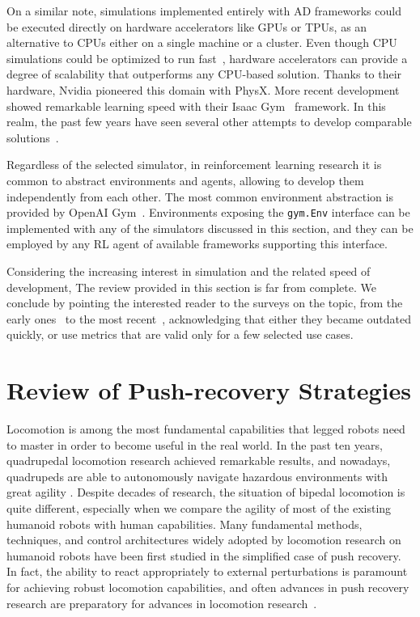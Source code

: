 On a similar note, simulations implemented entirely with \ac{AD} frameworks could be executed directly on hardware accelerators like \acp{GPU} or \acp{TPU}, as an alternative to \acp{CPU} either on a single machine or a cluster.
Even though \ac{CPU} simulations could be optimized to run fast~\parencite{hwangbo_per-contact_2018}, hardware accelerators can provide a degree of scalability that outperforms any \ac{CPU}-based solution.
Thanks to their hardware, Nvidia pioneered this domain with PhysX.
More recent development showed remarkable learning speed with their Isaac Gym~\parencite{liangGPUAcceleratedRoboticSimulation2018s, makoviychuk_isaac_2021, rudin_learning_2021} framework.
In this realm, the past few years have seen several other attempts to develop comparable solutions~\parencite{heiden_neuralsim_2021, qiao_efficient_2021, freeman_brax_2021}.

Regardless of the selected simulator, in reinforcement learning research it is common to abstract environments and agents, allowing to develop them independently from each other.
The most common environment abstraction is provided by OpenAI Gym~\parencite{brockman_openai_2016}.
Environments exposing the \verb|gym.Env| interface can be implemented with any of the simulators discussed in this section, and they can be
employed by any \ac{RL} agent of available frameworks supporting this interface.

Considering the increasing interest in simulation and the related speed of development, The review provided in this section is far from complete.
We conclude by pointing the interested reader to the surveys on the topic, from the early ones~\parencite{ivaldiToolsSimulatingHumanoid2014s,erezSimulationToolsModelbased2015s} to the most recent~\parencite{collins_review_2021, kim_survey_2021, korber_comparing_2021}, acknowledging that either they became outdated quickly, or use metrics that are valid only for a few selected use cases.

\section{Review of Push-recovery Strategies}

Locomotion is among the most fundamental capabilities that legged robots need to master in order to become useful in the real world.
In the past ten years, quadrupedal locomotion research achieved remarkable results, and nowadays, quadrupeds are able to autonomously navigate hazardous environments with great agility \parencite{lee_learning_2020, miki_learning_2022}.
Despite decades of research, the situation of bipedal locomotion is quite different, especially when we compare the agility of most of the existing humanoid robots with human capabilities.
Many fundamental methods, techniques, and control architectures widely adopted by locomotion research on humanoid robots have been first studied in the simplified case of push recovery.
In fact, the ability to react appropriately to external perturbations is paramount for achieving robust locomotion capabilities, and often advances in push recovery research are preparatory for advances in locomotion research~\parencite{jeong_robust_2019}.

